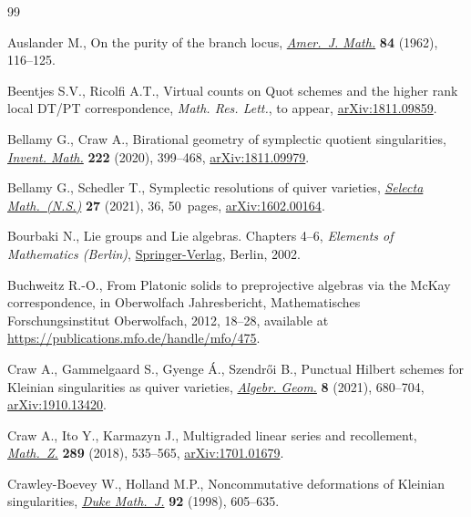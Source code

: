 \documentclass[pdftex]{sigma}%
\numberwithin{equation}{section}
\begin{document}
\begin{thebibliography}{99}
\footnotesize\itemsep=0pt

Auslander M., On the purity of the branch locus, \href{https://doi.org/10.2307/2372807}{\textit{Amer.~J. Math.}}
 \textbf{84} (1962), 116--125.

Beentjes S.V., Ricolfi A.T., Virtual counts on {Q}uot schemes and the higher
 rank local {DT/PT} correspondence, \textit{Math. Res. Lett.}, {t}o appear,
 \href{https://arxiv.org/abs/1811.09859}{arXiv:1811.09859}.

Bellamy G., Craw A., Birational geometry of symplectic quotient singularities,
 \href{https://doi.org/10.1007/s00222-020-00972-9}{\textit{Invent. Math.}} \textbf{222} (2020), 399--468, \href{https://arxiv.org/abs/1811.09979}{arXiv:1811.09979}.

Bellamy G., Schedler T., Symplectic resolutions of quiver varieties,
 \href{https://doi.org/10.1007/s00029-021-00647-0}{\textit{Selecta Math.~(N.S.)}} \textbf{27} (2021), 36, 50~pages,
 \href{https://arxiv.org/abs/1602.00164}{arXiv:1602.00164}.

Bourbaki N., Lie groups and {L}ie algebras. {C}hapters 4--6, \textit{Elements of
 Mathematics (Berlin)}, \href{https://doi.org/10.1007/978-3-540-89394-3}{Springer-Verlag}, Berlin, 2002.

Buchweitz R.-O., From {P}latonic solids to preprojective algebras via the
 {M}c{K}ay correspondence, in Oberwolfach Jahresbericht, Mathematisches
 Forschungsinstitut Oberwolfach, 2012, 18--28, available at
 \url{https://publications.mfo.de/handle/mfo/475}.

Craw A., Gammelgaard S., Gyenge \'A., Szendr\H{o}i B., Punctual {H}ilbert schemes
 for {K}leinian singularities as quiver varieties, \href{https://doi.org/10.14231/AG-2021-021}{\textit{Algebr. Geom.}}
 \textbf{8} (2021), 680--704, \href{https://arxiv.org/abs/1910.13420}{arXiv:1910.13420}.

Craw A., Ito Y., Karmazyn J., Multigraded linear series and recollement,
 \href{https://doi.org/10.1007/s00209-017-1965-1}{\textit{Math.~Z.}} \textbf{289} (2018), 535--565, \href{https://arxiv.org/abs/1701.01679}{arXiv:1701.01679}.

Crawley-Boevey W., Holland M.P., Noncommutative deformations of {K}leinian
 singularities, \href{https://doi.org/10.1215/S0012-7094-98-09218-3}{\textit{Duke Math.~J.}} \textbf{92} (1998), 605--635.


\end{thebibliography}
\end{document}
